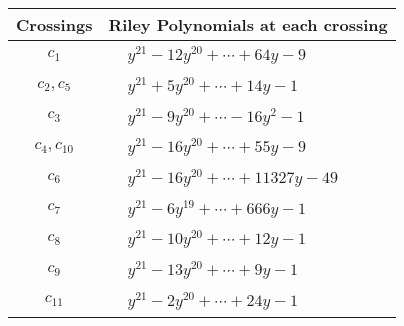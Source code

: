 \documentclass[1p]{elsarticle_modified}
\theoremstyle{definition}
\begin{document}
\begin{tabular}{m{50pt}|m{274pt}}
Crossings & \hspace{64pt}Riley Polynomials at each crossing \\
\hline $$\begin{aligned}c_{1}\end{aligned}$$&$\begin{aligned}
&y^{21}-12 y^{20}+\cdots+64 y-9
\end{aligned}$\\
\hline $$\begin{aligned}c_{2},c_{5}\end{aligned}$$&$\begin{aligned}
&y^{21}+5 y^{20}+\cdots+14 y-1
\end{aligned}$\\
\hline $$\begin{aligned}c_{3}\end{aligned}$$&$\begin{aligned}
&y^{21}-9 y^{20}+\cdots-16 y^2-1
\end{aligned}$\\
\hline $$\begin{aligned}c_{4},c_{10}\end{aligned}$$&$\begin{aligned}
&y^{21}-16 y^{20}+\cdots+55 y-9
\end{aligned}$\\
\hline $$\begin{aligned}c_{6}\end{aligned}$$&$\begin{aligned}
&y^{21}-16 y^{20}+\cdots+11327 y-49
\end{aligned}$\\
\hline $$\begin{aligned}c_{7}\end{aligned}$$&$\begin{aligned}
&y^{21}-6 y^{19}+\cdots+666 y-1
\end{aligned}$\\
\hline $$\begin{aligned}c_{8}\end{aligned}$$&$\begin{aligned}
&y^{21}-10 y^{20}+\cdots+12 y-1
\end{aligned}$\\
\hline $$\begin{aligned}c_{9}\end{aligned}$$&$\begin{aligned}
&y^{21}-13 y^{20}+\cdots+9 y-1
\end{aligned}$\\
\hline $$\begin{aligned}c_{11}\end{aligned}$$&$\begin{aligned}
&y^{21}-2 y^{20}+\cdots+24 y-1
\end{aligned}$\\
\hline
\end{tabular}\\~\\
\end{document}
